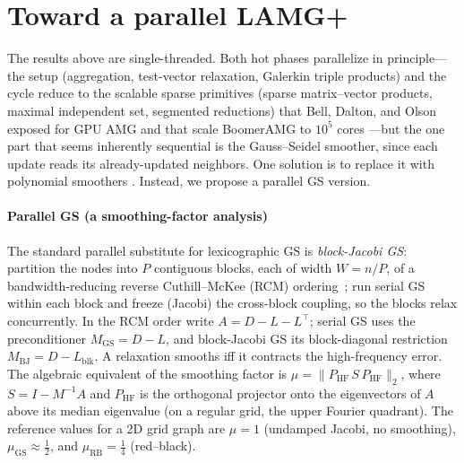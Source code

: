 \documentclass[review]{siamart220329}
\begin{document}
\section{Toward a parallel LAMG+}\label{sec:parallel}
The results above are single-threaded. Both hot phases parallelize in principle---the setup
(aggregation, test-vector relaxation, Galerkin triple products) and the cycle reduce to the scalable
sparse primitives (sparse matrix--vector products, maximal independent set, segmented reductions) that
Bell, Dalton, and Olson \cite{bell-dalton-olson} exposed for GPU AMG and that scale BoomerAMG to
$10^5$ cores \cite{baker-scaling,amgx}---but the one part that seems inherently sequential is
the Gauss--Seidel smoother, since each update reads its already-updated neighbors. One solution is to replace it with polynomial smoothers \cite{adams-poly}. Instead, we propose a parallel GS version.

\paragraph{Parallel GS (a smoothing-factor analysis)} The standard parallel
substitute for lexicographic GS is \emph{block-Jacobi GS}: partition the nodes into $P$ contiguous
blocks, each of width $W{=}n/P$, of a bandwidth-reducing reverse Cuthill--McKee (RCM)
ordering~\cite{cuthill-mckee}; run serial GS within each block and freeze (Jacobi) the cross-block
coupling, so the blocks relax concurrently. In the RCM order write $A=D-L-L^{\top}$; serial GS uses the
preconditioner $M_{\mathrm{GS}}=D-L$, and block-Jacobi GS its block-diagonal restriction
$M_{\mathrm{BJ}}=D-L_{\mathrm{blk}}$. A relaxation smooths iff it contracts the high-frequency error.
The algebraic equivalent of the smoothing factor \cite[\S\S3.1,\,3.3]{guide} is $\mu=\|P_{\mathrm{HF}}\,S\,P_{\mathrm{HF}}\|_2$, where $S=I-M^{-1}A$ and
$P_{\mathrm{HF}}$ is the orthogonal projector onto the eigenvectors of $A$ above its median eigenvalue
(on a regular grid, the upper Fourier quadrant). The reference values for a 2D grid graph are $\mu{=}1$ (undamped Jacobi,
no smoothing), $\mu_{\mathrm{GS}}\!\approx\!\tfrac12$, and $\mu_{\mathrm{RB}}{=}\tfrac14$ (red--black).
\end{document}
